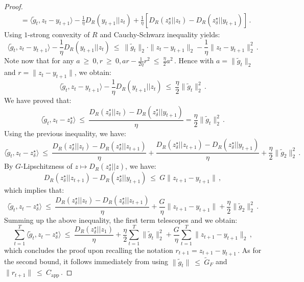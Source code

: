 \documentclass[a4paper,11pt,fullpage]{article}
\theoremstyle{plain}
\theoremstyle{definition}
\theoremstyle{plain}
\renewcommand{\leq}{~\le~}
\renewcommand{\geq}{~\ge~}
\begin{document}
\begin{proof}
\begin{align*}
&= \langle \tilde{g}_t, z_t - y_{t+1} \rangle - \frac{1}{\eta}D_R(y_{t+1}||z_t) 
+ \frac{1}{\eta}\left[ D_R(z_{\delta}^{\star}||z_t) - D_R(z_{\delta}^{\star}||y_{t+1}) \right]\,.
\end{align*}
Using $1$-strong convexity of $R$ and Cauchy-Schwarz inequality yields: 
\begin{equation*}
\langle \tilde{g}_t, z_t - y_{t+1} \rangle - \frac{1}{\eta}D_R(y_{t+1}||z_t)  \leq \|\tilde{g}_t\|_2 \cdot \|z_t - y_{t+1}\|_2 - \frac{1}{\eta} \|z_t - y_{t+1}\|_2^2\,. 
\end{equation*}
Note now that for any $a \geq 0, r \geq 0, ar - \frac{1}{2\eta} r^2 \leq \frac{\eta}{2}a^2\,.$ Hence with $a = \|\tilde{g}_t\|_2$ and $r = \|z_t - y_{t+1}\|$, we obtain: 
\begin{equation*}
\langle \tilde{g}_t, z_t - y_{t+1} \rangle - \frac{1}{\eta}D_R(y_{t+1}||z_t)  \leq \frac{\eta}{2} \|\tilde{g}_t\|_2^2\,.
\end{equation*}
We have proved that: 
\begin{equation*}
\langle \tilde{g}_t, z_t - z_{\delta}^{\star} \rangle 
\leq \frac{D_R(z_{\delta}^{\star}||z_t) - D_R(z_{\delta}^{\star}||y_{t+1})}{\eta} 
= \frac{\eta}{2}\|\tilde{g}_t\|_2^2\,.
\end{equation*}
Using the previous inequality, we have: 
\begin{equation*}
\langle \tilde{g}_t, z_t - z_{\delta}^{\star} \rangle 
\leq \frac{D_R(z_{\delta}^{\star}||z_{t}) - D_R(z_{\delta}^{\star}||z_{t+1})}{\eta} + \frac{D_R(z_{\delta}^{\star}||z_{t+1}) - D_R(z_{\delta}^{\star}||y_{t+1})}{\eta} + \frac{\eta}{2}\|\tilde{g}_2\|_2^2\,.
\end{equation*}
By $G$-Lipschitzness of $z \mapsto D_R(z_{\delta}^{\star}||z)$, we have: 
\begin{equation*}
D_R(z_{\delta}^{\star}||z_{t+1}) - D_R(z_{\delta}^{\star}||y_{t+1}) 
\leq G \|z_{t+1} - y_{t+1}\|\,,
\end{equation*}
which implies that: 
\begin{equation*}
\langle \tilde{g}_t, z_t - z_{\delta}^{\star} \rangle 
\leq \frac{D_R(z_{\delta}^{\star}||z_{t}) - D_R(z_{\delta}^{\star}||z_{t+1})}{\eta} + \frac{G}{\eta} \|z_{t+1} - y_{t+1}\| + \frac{\eta}{2}\|\tilde{g}_2\|_2^2\,.
\end{equation*}
Summing up the above inequality, the first term telescopes and we obtain:  
\begin{equation*}
\sum_{t=1}^T \langle \tilde{g}_t, z_t - z_{\delta}^{\star} \rangle 
\leq \frac{D_R(z_{\delta}^{\star}||z_1)}{\eta} + \frac{\eta}{2} \sum_{t=1}^T\|\tilde{g}_t\|_2^2 + \frac{G}{\eta} \sum_{t=1}^T \|z_{t+1} - y_{t+1}\|_2\,,
\end{equation*}
which concludes the proof upon recalling the notation $r_{t+1} = z_{t+1} - y_{t+1}\,.$
As for the second bound, it follows immediately from using $\|\tilde{g}_t\| \leq \tilde{G}_F$ and $\|r_{t+1}\| \leq C_{\text{app}}$\,.
\end{proof}
\end{document}
